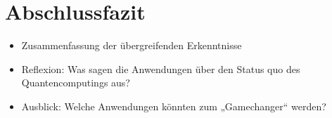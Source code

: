 \section{Abschlussfazit}
\begin{itemize}
    \item Zusammenfassung der übergreifenden Erkenntnisse
    \item Reflexion: Was sagen die Anwendungen über den Status quo des Quantencomputings aus?
    \item Ausblick: Welche Anwendungen könnten zum „Gamechanger“ werden?
\end{itemize}


\printbibliography
